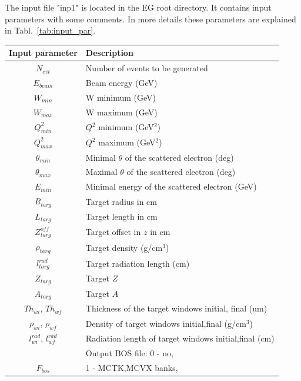 The input file "inp1" is located in the EG root directory. It contains input parameters with some comments. In more details these parameters are explained in Tabl.~\ref{tab:input_par}. 



\begin{table}[h]\scriptsize
\begin{center}
  \renewcommand{\arraystretch}{1.2}
\begin{tabular}{|c|l|}

\hline
Input parameter & Description\\
\hline 
$N_{evt}$ & Number of events to be generated \\
\hline
$E_{beam}$ & Beam energy (GeV) \\
\hline
$W_{min}$ & W minimum (GeV) \\
\hline
$W_{max}$& W maximum (GeV) \\
\hline
$Q^{2}_{min}$ & $Q^{2}$ minimum (GeV$^2$) \\
\hline
$Q^{2}_{max}$     & $Q^2$ maximum (GeV$^2$) \\
\hline 
$\theta_{min}$ & Minimal $\theta$ of the scattered electron (deg)\\
\hline 
 $\theta_{max}$  & Maximal $\theta$ of the scattered electron (deg)\\
\hline 
$E_{min}$ & Minimal energy of the scattered electron (GeV)\\
\hline 
$R_{targ}$  & Target radius in cm \\
\hline
$L_{targ}$ & Target length in cm \\
\hline
$Z^{off}_{targ}$ & Target offset in $z$ in cm\\
\hline
$\rho_{targ}$ & Target density (g/cm$^3$)\\
\hline
$l^{rad}_{targ}$  & Target radiation length (cm)\\
\hline
$Z_{targ}$ & Target $Z$\\
\hline
$A_{targ}$ & Target $A$\\
\hline
$Th_{wi}$,  $Th_{wf}$   & Thickness of the target windows initial, final (um)\\
\hline
$\rho_{wi}$, $\rho_{wf}$   & Density of target windows initial,final (g/cm$^3$)\\
\hline
$l^{rad}_{wi}$, $l^{rad}_{wf}$  & Radiation length of target windows initial,final (cm)\\
\hline
 &  Output BOS file: 0 - no,\\
$F_{bos}$   &  1 - MCTK,MCVX banks,\\

\end{tabular}
\end{center}
\end{table}
